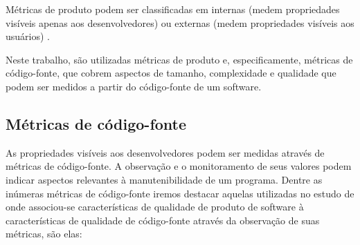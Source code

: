 Métricas de produto podem ser classificadas em internas (medem propriedades
visíveis apenas aos desenvolvedores) ou externas (medem propriedades visíveis
aos usuários) \cite{Mohamed1994}.

Neste trabalho, são utilizadas métricas de produto e, especificamente,
métricas de código-fonte, que cobrem aspectos de tamanho, complexidade e
qualidade que podem ser medidos a partir do código-fonte de um software.

\subsection{Métricas de código-fonte} \label{metricas-de-codigo}

As propriedades visíveis aos desenvolvedores podem ser medidas através de
métricas de código-fonte. A observação e o monitoramento de seus valores podem
indicar aspectos relevantes à manutenibilidade de um programa. Dentre as
inúmeras métricas de código-fonte iremos destacar aquelas utilizadas no estudo
de  onde associou-se características de qualidade de
produto de software à características de qualidade de código-fonte através da
observação de suas métricas, são elas:

